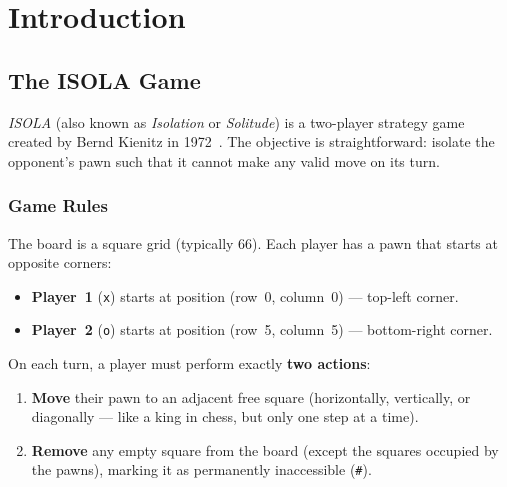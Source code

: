 
\chapter{Introduction}
\label{chap:intro}

\section{The ISOLA Game}
\label{sec:game}

\textit{ISOLA} (also known as \textit{Isolation} or \textit{Solitude}) is a
two-player strategy game created by Bernd Kienitz in 1972~\cite{kienitz1972isola}. The objective is
straightforward: isolate the opponent's pawn such that it cannot make any
valid move on its turn.

\subsection{Game Rules}
\label{subsec:rules}

The board is a square grid (typically 6{\texttimes}6). Each player has a pawn that
starts at opposite corners:

\begin{itemize}
  \item \textbf{Player~1} (\texttt{x}) starts at position
        (row~0, column~0) --- top-left corner.
  \item \textbf{Player~2} (\texttt{o}) starts at position
        (row~5, column~5) --- bottom-right corner.
\end{itemize}

On each turn, a player must perform exactly \textbf{two actions}:

\begin{enumerate}
  \item \textbf{Move} their pawn to an adjacent free square
        (horizontally, vertically, or diagonally --- like a king in
        chess, but only one step at a time).
  \item \textbf{Remove} any empty square from the board (except the
        squares occupied by the pawns), marking it as permanently
        inaccessible (\texttt{\#}).
\end{enumerate}

